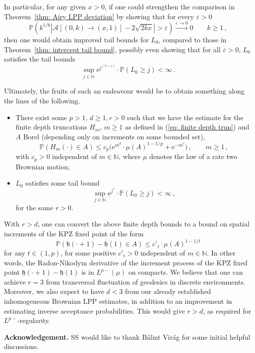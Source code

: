 \documentclass[11pt, reqno]{amsart}
\numberwithin{equation}{section}
\newcommand{\N}{\ensuremath{\mathbb{N}}}
\newcommand{\PP}{\ensuremath{\mathbb{P}}}
\begin{document}
In particular, for any given $x>0$, if one could strengthen the comparison in Theorem~\ref{thm: Airy LPP deviation} by showing that for every $\varepsilon > 0$
$$
\PP \left(k^{1/6}|\mathcal{A}[(0, k) \rightarrow (x,1)]-{2\sqrt{2kx}}| > \varepsilon\right) \stackrel{\varepsilon \to 0}{\longrightarrow} 0  \qquad k\ge 1\,,
$$
then one would obtain improved tail bounds for $L_0$, compared to those in Theorem~\ref{thm: intercept tail bound}, possibly even showing that for all $\varepsilon > 0$, $L_0$ satisfies the tail bounds
    \begin{equation*}
        \displaystyle\sup_{j\in \N} \mathrm{e}^{j^{(3-\varepsilon)}}\cdot \PP(L_0\geq j)<\infty\,.
    \end{equation*}

Ultimately, the fruits of such an endeavour would be to obtain something along the lines of the following. 
\begin{itemize}
    \item[1.] There exist some $p>1$, $d\ge 1,r>0$ such that we have the estimate for the finite depth truncations $H_m$, $m\ge 1$ as defined in (\ref{eq: finite depth trun}) and $A$ Borel (depending only on increments on some bounded set),
    \begin{equation*}
    \PP(H_m(\cdot)\in A) \le c_p \big( \mathrm{e}^{m^{d}}\cdot \mu(A)^{1-1/p} + 
     \mathrm{e}^{-m^{r}}\big )\,,\qquad m\ge 1\,,
    \end{equation*}
    with $c_p>0$ independent of $m\in \N$, where $\mu$ denotes the law of a rate two Brownian motion;
    \item[2.] $L_0$ satisfies some tail bound
    \begin{equation*}
        \displaystyle\sup_{j\in \N} \mathrm{e}^{j^r}\cdot \PP(L_0\geq j)<\infty\,,
    \end{equation*}
     for the same $r>0$.
\end{itemize}
     
With $r > d$, one can convert the above finite depth bounds to a bound on spatial increments of the KPZ fixed point of the form 
    \begin{equation*}
     \PP(\mathfrak{h}(\cdot + 1)-\mathfrak{h}(1)\in A) \le c'_t  
     \cdot \mu(A)^{1-1/t}
    \end{equation*}
    for any $t\in (1,p)$, for some positive $c'_t > 0$ independent of $m\in \N$. In other words, the Radon-Nikodym derivative of the increment process of the KPZ fixed point $\mathfrak{h}(\cdot + 1)-\mathfrak{h}(1)$ is in $L^{p-}(\mu)$ on compacts. We believe that one can achieve $r = 3$ from transversal fluctuation of geodesics in discrete environments. Moreover, we also expect to have $d<3$ from our already established inhomogeneous Brownian LPP estimates, in addition to an improvement in estimating inverse acceptance probabilities. This would give $r>d$, as required for $L^{p-}$-regularity.

\medskip\medskip
\noindent\textbf{Acknowledgement.} SS would like to thank B\'alint Vir\'ag for some initial helpful discussions.



\end{document}
